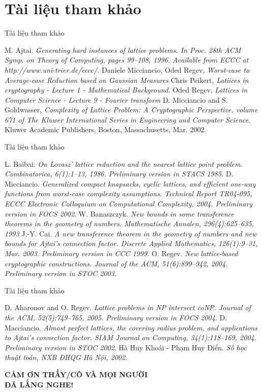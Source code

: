 \documentclass[notheorems,envcountsect,serif,12pt]{beamer}
\numberwithin{equation}{section}
\theoremstyle{definition}
\numberwithin{equation}{section}
\begin{document}
\section{Tài liệu tham khảo}
\begin{frame}{Tài liệu tham khảo}

\begin{thebibliography}{9}
	M. Ajtai. \textit{Generating hard instances of lattice problems. In Proc. 28th ACM Symp. on Theory of Computing, pages 99–108, 1996. Available from ECCC at http://www.uni-trier.de/eccc/.}
	 Daniele Micciancio, Oded Regev, \textit{Worst-case to Average-case Reduction based on Gaussian Measures} 
	 Chris Peikert, \textit{Latiices in cryptography - Lecture 1 - Mathematical Background}.
	 Oded Regev, \textit{Lattices in Computer Science - Lecture 9 - Fourier transform}
	 D. Micciancio and S. Goldwasser, \textit{Complexity of Lattice Problem: A Cryptographic Perspective, volume 671 of The Kluwer International Series in Engineering and Computer Science}. Kluwer Academic Publishers, Boston, Massachusetts, Mar. 2002
\end{thebibliography}
\end{frame}
\begin{frame}{Tài liệu tham khảo}

\begin{thebibliography}{9}
	 L. Baibai. \textit{On Lovasz' lattice reduction and the nearest lattice point problem. Combinatorica, 6(1):1–13, 1986. Preliminary version in STACS 1985.}
	 D. Micciancio. \textit{Generalized compact knapsacks, cyclic lattices, and efficient one-way functions from worst-case complexity assumptions. Technical Report TR04-095, ECCC Electronic Colloquium on Computational Complexity, 2004. Preliminary version in FOCS 2002}.
	W. Banaszczyk. \textit{New bounds in some transference theorems in the geometry of numbers. Mathematische Annalen, 296(4):625–635, 1993}
	J.-Y. Cai. \textit{A new transference theorem in the geometry of numbers and new bounds for Ajtai’s connection factor. Discrete Applied Mathematics, 126(1):9–31, Mar. 2003. Preliminary version in CCC 1999.}
	 O. Regev. \textit{New lattice-based cryptographic constructions. Journal of the ACM, 51(6):899–942, 2004. Preliminary version in STOC 2003}.
\end{thebibliography}
\end{frame}
\begin{frame}{Tài liệu tham khảo}

\begin{thebibliography}{9}
	 D. Aharonov and O. Regev. \textit{Lattice problems in NP intersect coNP. Journal of the ACM, 52(5):749–765, 2005. Preliminary version in FOCS 2004}.
	 D. Macciancio. \textit{Almost perfect lattices, the covering radius problem, and applications to Ajtai’s connection factor. SIAM Journal on Computing, 34(1):118–169, 2004. Preliminary version in STOC 2002}.
	 Hà Huy Khoái - Phạm Huy Điển. \textit{Số học thuật toán, NXB ĐHQG Hà Nội, 2002}.
\end{thebibliography}
\end{frame}
\begin{frame}
	\begin{center}
		\selectfont\color{red!50!blue}\centering\scshape\Large\bfseries\huge CẢM ƠN THẦY/CÔ VÀ MỌI NGƯỜI\\
		ĐÃ LẮNG NGHE!
	\end{center}
\end{frame}
\end{document}
